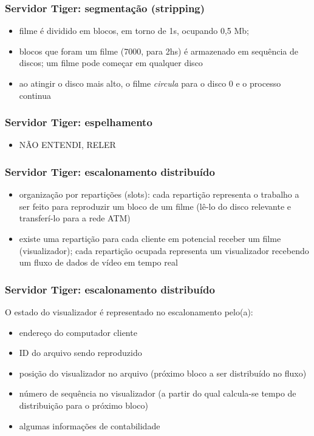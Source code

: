 \documentclass[]{beamer}
\begin{document}
\begin{frame}
 \frametitle{Servidor Tiger: segmentação (stripping)}
 \begin{itemize}
   \item filme é dividido em blocos, em torno de 1s, ocupando 0,5 Mb;
   \item blocos que foram um filme (7000, para 2hs) é armazenado em sequência de discos;
um filme pode começar em qualquer disco
   \item ao atingir o disco mais alto, o filme \emph{circula} para o disco 0 e o
processo continua
  \end{itemize}
\end{frame}

\begin{frame}
 \frametitle{Servidor Tiger: espelhamento}
 \begin{itemize}
   \item NÃO ENTENDI, RELER
  \end{itemize}
\end{frame}

\begin{frame}
 \frametitle{Servidor Tiger: escalonamento distribuído}
 \begin{itemize}
   \item organização por repartições (slots): cada repartição representa o trabalho a ser
feito para reproduzir um bloco de um filme (lê-lo do disco relevante e 
transferí-lo para a rede ATM)
   \item existe uma repartição para cada cliente em potencial receber um 
filme (visualizador); cada
repartição ocupada representa um visualizador recebendo um fluxo de dados de vídeo em tempo
real
  \end{itemize}
\end{frame}

\begin{frame}
 \frametitle{Servidor Tiger: escalonamento distribuído}
O estado do visualizador é representado no escalonamento pelo(a):
 \begin{itemize}
       \item endereço do computador cliente
       \item ID do arquivo sendo reproduzido
       \item posição do visualizador no arquivo (próximo bloco a ser distribuído no fluxo)
       \item número de sequência no visualizador (a partir do qual calcula-se tempo de
distribuição para o próximo bloco)
       \item algumas informações de contabilidade
 \end{itemize}
\end{frame}
\end{document}
